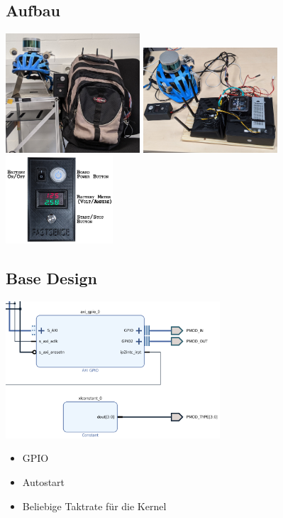 \documentclass{beamer}
\begin{document}
\subsection{Aufbau}
\begin{frame}{\subsecname}
\centering
\includegraphics[width=5cm]{images/Rucksack01.jpg}
\includegraphics[width=5cm]{images/Rucksack02.jpg}
\includegraphics[width=4cm]{images/Box.jpg}
\end{frame}

\subsection{Base Design}
\begin{frame}{\subsecname}
\begin{center}
\includegraphics[width=8cm]{images/base_design.png}
\end{center}
\begin{itemize}
\item{GPIO}
\item{Autostart}
\item{Beliebige Taktrate für die Kernel}
\end{itemize}
\end{frame}
\end{document}
